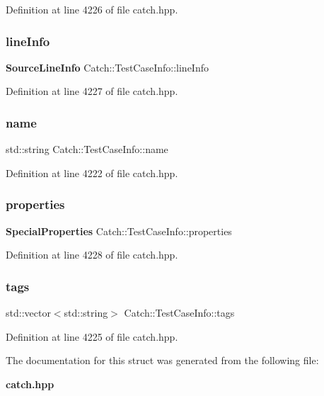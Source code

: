 Definition at line 4226 of file catch.\+hpp.

\mbox{\label{struct_catch_1_1_test_case_info_aa9407b7f442655b51a2aad24b3fa2fd3}} 
\subsubsection{lineInfo}
{\footnotesize\ttfamily \textbf{ Source\+Line\+Info} Catch\+::\+Test\+Case\+Info\+::line\+Info}



Definition at line 4227 of file catch.\+hpp.

\mbox{\label{struct_catch_1_1_test_case_info_a463794e2f5cfead307c93efd134ade36}} 
\subsubsection{name}
{\footnotesize\ttfamily std\+::string Catch\+::\+Test\+Case\+Info\+::name}



Definition at line 4222 of file catch.\+hpp.

\mbox{\label{struct_catch_1_1_test_case_info_afc1e84bd7a2e180895a06d9131302af0}} 
\subsubsection{properties}
{\footnotesize\ttfamily \textbf{ Special\+Properties} Catch\+::\+Test\+Case\+Info\+::properties}



Definition at line 4228 of file catch.\+hpp.

\mbox{\label{struct_catch_1_1_test_case_info_a150a7cbca1dd0c91799ccb14ff822eb0}} 
\subsubsection{tags}
{\footnotesize\ttfamily std\+::vector$<$std\+::string$>$ Catch\+::\+Test\+Case\+Info\+::tags}



Definition at line 4225 of file catch.\+hpp.



The documentation for this struct was generated from the following file\+:\begin{DoxyCompactItemize}
\item 
\textbf{ catch.\+hpp}\end{DoxyCompactItemize}
